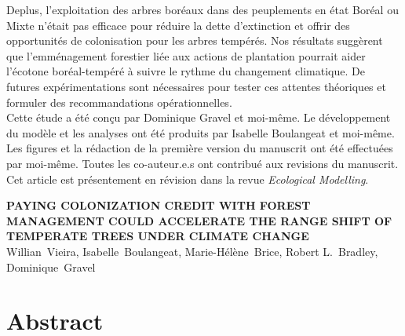 Deplus, l'exploitation des arbres boréaux dans des peuplements en état
Boréal ou Mixte n'était pas efficace pour réduire la dette d'extinction
et offrir des opportunités de colonisation pour les arbres tempérés. Nos
résultats suggèrent que l'emménagement forestier liée aux actions de
plantation pourrait aider l'écotone boréal-tempéré à suivre le rythme du
changement climatique. De futures expérimentations sont nécessaires pour
tester ces attentes théoriques et formuler des recommandations
opérationnelles.\\

Cette étude a été conçu par Dominique Gravel et moi-même. Le
développement du modèle et les analyses ont été produits par Isabelle
Boulangeat et moi-même. Les figures et la rédaction de la première
version du manuscrit ont été effectuées par moi-même. Toutes les
co-auteur.e.s ont contribué aux revisions du manuscrit. Cet article est
présentement en révision dans la revue \emph{Ecological Modelling}.\\

\vfill{}
\pagebreak

\begin{center}
\textbf{\MakeUppercase{Paying colonization credit with forest management
could accelerate the range shift of temperate trees under climate
change}} \\
Willian~Vieira, Isabelle~Boulangeat, Marie-Hélène~Brice, Robert
L.~Bradley, Dominique~Gravel
\end{center}

\section{Abstract}

